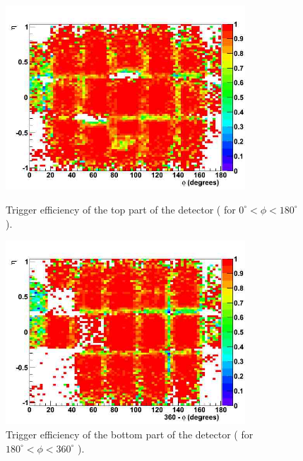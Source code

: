\begin{figure}[hbtp]
\begin{minipage}{1.0\textwidth}
  \begin{center}
 
     \includegraphics[width=0.8\textwidth]{eff_eta_phi_top_09}
       \caption{ Trigger efficiency of the top part of the detector (
 for $ 0^\circ < \phi < 180^\circ $ ). 
}
    \label{fig:eff_eta_phi_top_09}
  \end{center}
  \end{minipage}

     \begin{minipage}{1.0\textwidth}
     \begin{center}
      \includegraphics[width=0.8\textwidth]{eff_eta_phi_bot_09}
       \caption{ Trigger efficiency of the bottom part of the detector (
 for $ 180^\circ < \phi < 360^\circ $ ).
}
    \label{fig:eff_eta_phi_bot_09}

  \end{center}
  \end{minipage}
     
\end{figure}

